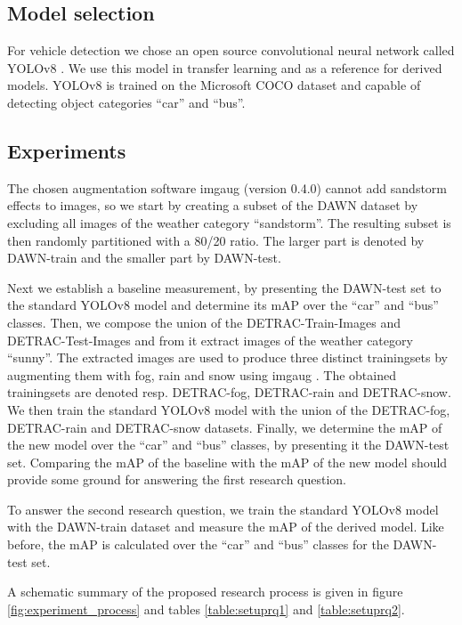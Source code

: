 \documentclass[]{article}
\begin{document}
\subsection{Model selection}
 
	For vehicle detection we chose an open source convolutional neural network called YOLO{\small v8} \cite{yolov8_ultralytics}. We use this model in transfer learning and as a reference for derived models. YOLO{\small v8} is trained on the Microsoft COCO dataset \cite{linMicrosoftCOCOCommon2015a} and capable of detecting object categories ``car'' and ``bus''.

\subsection{Experiments}

	The chosen augmentation software imgaug \cite{imgaug} (version 0.4.0) cannot add sandstorm effects to images, so we start by creating a subset of the DAWN dataset by excluding all images of the weather category ``sandstorm''. The resulting subset is then randomly partitioned with a 80/20 ratio. The larger part is denoted by DAWN-train and the smaller part by DAWN-test.

	Next we establish a baseline measurement, by presenting the DAWN-test set to the standard YOLO{\small v8} model and determine its mAP over the ``car'' and ``bus'' classes. Then, we compose the union of the DETRAC-Train-Images and DETRAC-Test-Images and from it extract images of the weather category ``sunny''. The extracted images are used to produce three distinct trainingsets by augmenting them with fog, rain and snow using imgaug \cite{imgaug}. The obtained trainingsets are denoted resp. DETRAC-fog, DETRAC-rain and DETRAC-snow. We then train the standard YOLO{\small v8} model with the union of the DETRAC-fog, DETRAC-rain and DETRAC-snow datasets. Finally, we determine the mAP of the new model over the  ``car'' and ``bus'' classes, by presenting it the DAWN-test set. Comparing the mAP of the baseline with the mAP of the new model should provide some ground for answering the first research question.

	To answer the second research question, we train the standard YOLO{\small v8} model with the DAWN-train dataset and measure the mAP of the derived model. Like before, the mAP is calculated over the ``car'' and ``bus'' classes for the DAWN-test set.
	
	A schematic summary of the proposed research process is given in figure \ref{fig:experiment_process} and tables \ref{table:setuprq1} and \ref{table:setuprq2}.
	
\end{document}
